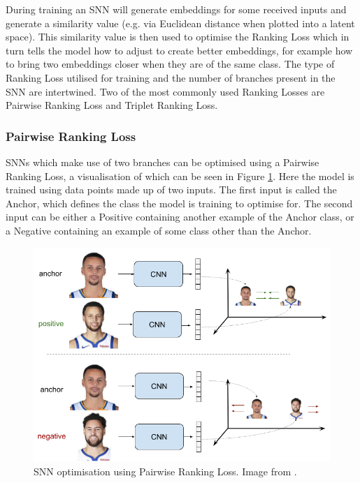During training an SNN will generate embeddings for some received inputs and generate a similarity value (e.g. via Euclidean distance when plotted into a latent space). This similarity value is then used to optimise the Ranking Loss which in turn tells the model how to adjust to create better embeddings, for example how to bring two embeddings closer when they are of the same class. The type of Ranking Loss utilised for training and the number of branches present in the SNN are intertwined. Two of the most commonly used Ranking Losses are Pairwise Ranking Loss and Triplet Ranking Loss.

\subsubsection{Pairwise Ranking Loss}\label{ch:ID,sec:SNNBackground,sub:lossFunction,subsub:Pairwise}

SNNs which make use of two branches can be optimised using a Pairwise Ranking Loss, a visualisation of which can be seen in Figure \ref{fig:pairwise_ranking_loss_faces}. Here the model is trained using data points made up of two inputs. The first input is called the Anchor, which defines the class the model is training to optimise for. The second input can be either a Positive containing another example of the Anchor class, or a Negative containing an example of some class other than the Anchor. 

\begin{figure}[h]
	\begin{center}
		\includegraphics[scale=0.4]{Chapter5/figs/pairwise_ranking_loss_faces.png}
	\end{center}
	\caption{SNN optimisation using Pairwise Ranking Loss. Image from \cite{gomez_understanding_2019}.}
	\label{fig:pairwise_ranking_loss_faces}
\end{figure}

